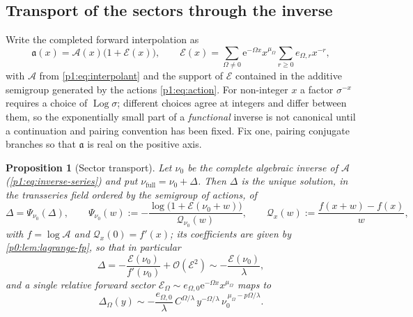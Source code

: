 \documentclass[11pt,a4paper,oneside]{book}
\theoremstyle{plain}
\newtheorem{proposition}[theorem]{Proposition}
\theoremstyle{definition}
\theoremstyle{remark}
\newcommand{\e}{\mathrm{e}}
\newcommand{\bigO}{\mathcal{O}}
\begin{document}
\subsection{Transport of the sectors through the inverse}

Write the completed forward interpolation as
\begin{equation}
 \mathfrak a(x)=\mathcal A(x)\bigl(1+\mathcal E(x)\bigr),
 \qquad
 \mathcal E(x)=\sum_{\Omega\ne0}\e^{-\Omega x}x^{\mu_\Omega}
 \sum_{r\ge0}e_{\Omega,r}x^{-r},
 \label{p1:eq:full-interp}
\end{equation}
with $\mathcal A$ from \cref{p1:eq:interpolant} and the support of $\mathcal E$ contained in
the additive semigroup generated by the actions \cref{p1:eq:action}.  For non-integer $x$ a
factor $\sigma^{-x}$ requires a choice of $\operatorname{Log}\sigma$; different choices agree
at integers and differ between them, so the exponentially small part of a \emph{functional}
inverse is not canonical until a continuation and pairing convention has been fixed.  Fix one,
pairing conjugate branches so that $\mathfrak a$ is real on the positive axis.

\begin{proposition}[Sector transport]
\label{p1:prop:transport}
Let $\nu_0$ be the complete algebraic inverse of $\mathcal A$ (\cref{p1:eq:inverse-series})
and put $\nu_{\mathrm{full}}=\nu_0+\Delta$.  Then $\Delta$ is the unique solution, in the
transseries field ordered by the semigroup of actions, of
\begin{equation}
 \Delta=\Psi_{\nu_0}(\Delta),
 \qquad
 \Psi_{\nu_0}(w):=-\frac{\log\bigl(1+\mathcal E(\nu_0+w)\bigr)}
 {\mathcal Q_{\nu_0}(w)},
 \qquad
 \mathcal Q_{x}(w):=\frac{f(x+w)-f(x)}{w},
 \label{p1:eq:transport-fp}
\end{equation}
with $f=\log\mathcal A$ and $\mathcal Q_x(0)=f'(x)$; its coefficients are given by
\cref{p0:lem:lagrange-fp}, so that in particular
\begin{equation}
 \Delta=-\frac{\mathcal E(\nu_0)}{f'(\nu_0)}
 +\bigO(\mathcal E^{2})
 \sim-\frac{\mathcal E(\nu_0)}{\lambda},
 \label{p1:eq:transport-linear}
\end{equation}
and a single relative forward sector $\mathcal E_\Omega\sim e_{\Omega,0}\e^{-\Omega
x}x^{\mu_\Omega}$ maps to
\begin{equation}
 \Delta_\Omega(y)\sim
 -\frac{e_{\Omega,0}}{\lambda}\,C^{\Omega/\lambda}\,
 y^{-\Omega/\lambda}\,\nu_0^{\,\mu_\Omega-p\Omega/\lambda}.
 \label{p1:eq:transport-y}
\end{equation}
\end{proposition}
\end{document}
